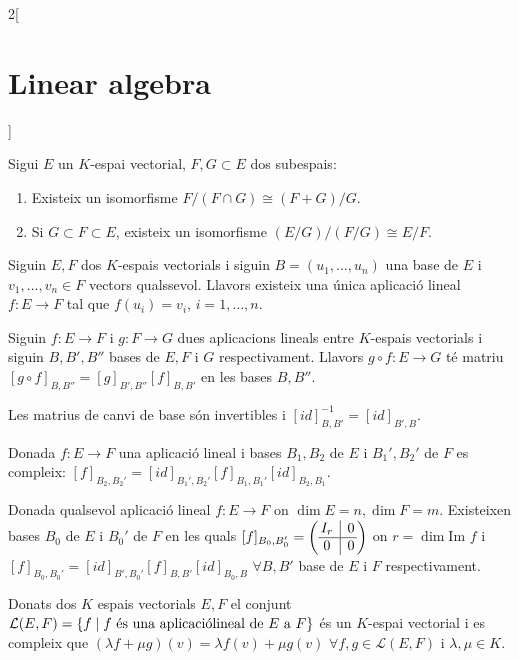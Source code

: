\documentclass[class=article,10pt,crop=false]{standalone}
\begin{document}
\begin{multicols}{2}[\section{Linear algebra}]
\begin{corollary}
\end{corollary}
\begin{theorem}
Sigui $E$ un $K$-espai vectorial, $F,G\subset E$ dos subespais:
\begin{enumerate}
    \item Existeix un isomorfisme $F/(F\cap G)\cong(F+G)/G$.
    \item Si $G\subset F\subset E$, existeix un isomorfisme $(E/G)/(F/G)\cong E/F$.
\end{enumerate}
\end{theorem}
\begin{theorem}
Siguin $E,F$ dos $K$-espais vectorials i siguin $B=(u_1,\ldots,u_n)$ una base de $E$ i $v_1,\ldots,v_n\in F$ vectors qualssevol. Llavors existeix una única aplicació lineal $f:E\rightarrow F$ tal que $f(u_i)=v_i$, $i=1,\ldots,n$. 
\end{theorem}
\begin{prop}
Siguin $f:E\rightarrow F$ i $g:F\rightarrow G$ dues aplicacions lineals entre $K$-espais vectorials i siguin $B,B',B''$ bases de $E,F$ i $G$ respectivament. Llavors $g\circ f:E\rightarrow G$ té matriu $[g\circ f]_{B,B''}=[g]_{B',B''}[f]_{B,B'}$ en les bases $B, B''$.
\end{prop}
\begin{corollary}
Les matrius de canvi de base són invertibles i $[id]_{B,B'}^{-1}=[id]_{B',B}$.
\end{corollary}
\begin{prop}
Donada $f:E\rightarrow F$ una aplicació lineal i bases $B_1,B_2$ de $E$ i $B_1',B_2'$ de $F$ es compleix: $[f]_{B_2,B_2'}=[id]_{B_1',B_2'}[f]_{B_1,B_1'}[id]_{B_2,B_1}$.
\end{prop}
\begin{theorem}
Donada qualsevol aplicació lineal $f:E\rightarrow F$ on $\dim E=n, \dim F=m$. Existeixen bases $B_0$ de $E$ i $B_0'$ de $F$ en les quals $[f]_{B_0,B_0'}=\left(\begin{array}{@{\,} c|c @{\,}}
    I_r & 0\\
    \hline
    0 & 0
    \end{array}\right)$ on $r=\dim\text{Im }f$ i $[f]_{B_0,B_0'}=[id]_{B',B_0'}[f]_{B,B'}[id]_{B_0,B}$ $\forall B,B'$ base de $E$ i $F$ respectivament.
\end{theorem}
\begin{lemma}
Donats dos $K$ espais vectorials $E,F$ el conjunt $\mathcal{L}(E,F)=\{f\mid f\text{ és una aplicació}\\ \text{lineal de $E$ a $F$}\}$ és un $K$-espai vectorial i es compleix que $(\lambda f+\mu g)(v)=\lambda f(v)+\mu g(v)$ $\forall f,g\in\mathcal{L}(E,F)$ i $\lambda,\mu\in K$.

\end{lemma}
\end{multicols}
\end{document}
